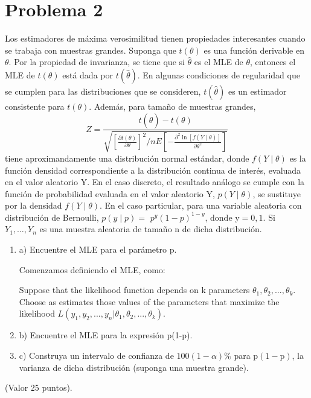 \section{Problema 2}


Los estimadores de máxima verosimilitud tienen propiedades interesantes cuando se trabaja con muestras grandes. Suponga que $t(\theta)$ es una función derivable en $\theta$. Por la propiedad de invarianza, se tiene que si $\hat{\theta}$ es el MLE de $\theta$, entonces el MLE de $t(\theta)$ está dada por $t(\hat{\theta}) .$ En algunas condiciones de regularidad que se cumplen para las distribuciones que se consideren, $t(\hat{\theta})$ es un estimador consistente para $t(\theta) .$ Además, para tamaño de muestras grandes,
$$
Z=\frac{t(\hat{\theta})-t(\theta)}{\sqrt{\left[\frac{\partial t(\theta)}{\partial \theta}\right]^{2} \Big/ n E\left[-\frac{\partial^{2} \ln [f(Y \mid \theta)]}{\partial \theta^{2}}\right]}}
$$
tiene aproximandamente una distribución normal estándar, donde $f(Y \mid \theta)$ es la función densidad correspondiente a la distribución continua de interés, evaluada en el valor aleatorio Y. En el caso discreto, el resultado análogo se cumple con la función de probabilidad evaluada en el valor aleatorio $\mathrm{Y}$, $p(Y \mid \theta)$, se sustituye por la densidad $f(Y \mid \theta)$. En el caso particular, para una variable aleatoria con distribución de Bernoulli, $p(y \mid p)=$ $p^{y}(1-p)^{1-y}$, donde $\mathrm{y}=0,1 .$ Si $Y_{1}, \ldots, Y_{n}$ es una muestra aleatoria de tamaño $\mathrm{n}$ de dicha distribución.

\begin{enumerate}
	\item a) Encuentre el MLE para el parámetro p.
	\begin{solution}
		Comenzamos definiendo el MLE, como: 
		\begin{tcolorbox}[colback=gray!15,colframe=black!1!black,title=Method of Maximum Likehood]
			Suppose that the likelihood function depends on k parameters $\theta_1,\theta_2,...,\theta_k$. Choose as estimates those values of the parameters that maximize the likelihood $L(y_1, y_2,..., y_n |\theta_1,\theta_2,...,\theta_k)$.
			\end{tcolorbox}

	\end{solution}
	\item b) Encuentre el MLE para la expresión p(1-p).
	\item c) Construya un intervalo de confianza de $100(1-\alpha) \%$ para $\mathrm{p}(1-\mathrm{p})$, la varianza de dicha distribución (suponga una muestra grande).
\end{enumerate}
 (Valor 25 puntos).
